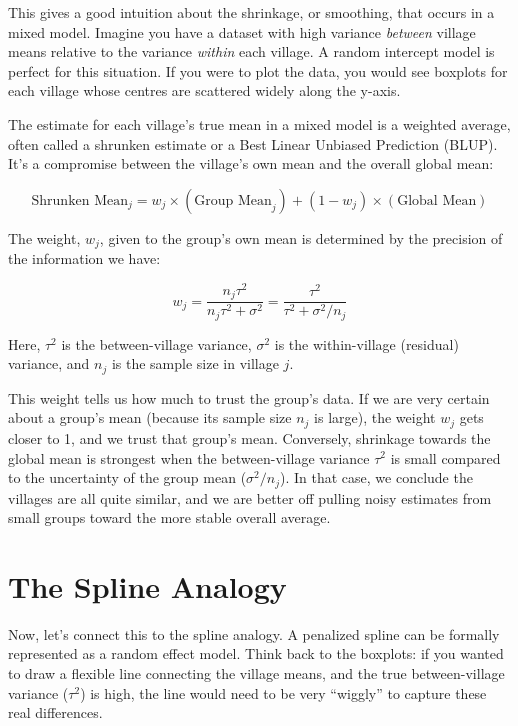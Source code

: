 \documentclass{article}
\begin{document}
This gives a good intuition about the shrinkage, or smoothing, that occurs in a mixed model. Imagine you have a dataset with high variance \emph{between} village means relative to the variance \emph{within} each village. A random intercept model is perfect for this situation. If you were to plot the data, you would see boxplots for each village whose centres are scattered widely along the y-axis.

The estimate for each village's true mean in a mixed model is a weighted average, often called a shrunken estimate or a Best Linear Unbiased Prediction (BLUP). It's a compromise between the village's own mean and the overall global mean:

\begin{equation*}
\text{Shrunken Mean}_j = w_j \times (\text{Group Mean}_j) + (1 - w_j) \times (\text{Global Mean})
\end{equation*}

The weight, $w_j$, given to the group's own mean is determined by the precision of the information we have:

\begin{equation*}
w_j = \frac{n_j\tau^2}{n_j\tau^2 + \sigma^2} = \frac{\tau^2}{\tau^2 + \sigma^2/n_j}
\end{equation*}

Here, $\tau^2$ is the between-village variance, $\sigma^2$ is the within-village (residual) variance, and $n_j$ is the sample size in village $j$.

This weight tells us how much to trust the group's data. If we are very certain about a group's mean (because its sample size $n_j$ is large), the weight $w_j$ gets closer to 1, and we trust that group's mean. Conversely, shrinkage towards the global mean is strongest when the between-village variance $\tau^2$ is small compared to the uncertainty of the group mean ($\sigma^2/n_j$). In that case, we conclude the villages are all quite similar, and we are better off pulling noisy estimates from small groups toward the more stable overall average.

\section*{The Spline Analogy}

Now, let's connect this to the spline analogy. A penalized spline can be formally represented as a random effect model. Think back to the boxplots: if you wanted to draw a flexible line connecting the village means, and the true between-village variance ($\tau^2$) is high, the line would need to be very ``wiggly'' to capture these real differences.
\end{document}
